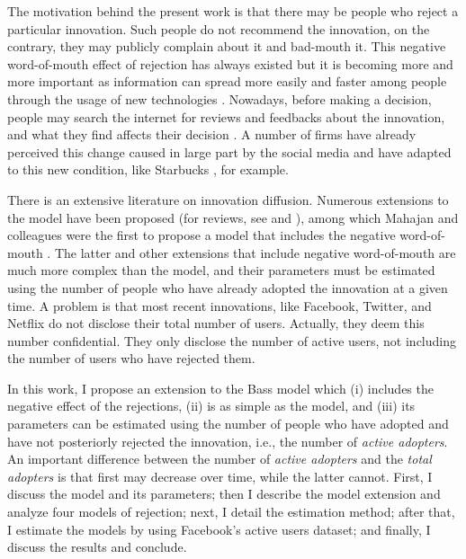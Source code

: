 The motivation behind the present work is that there may be people who reject a particular innovation. Such people do not recommend the innovation, on the contrary, they may publicly complain about it and bad-mouth it. This negative word-of-mouth effect of rejection has always existed \citep{richins1983negative, bone1995word, smith1995effects, buttle1998word} but it is becoming more and more important as information can spread more easily and faster among people through the usage of new technologies \citep{jansen2009twitter, godes2004using, babic2015effect}. Nowadays, before making a decision, people may search the internet for reviews and feedbacks about the innovation, and what they find affects their decision \citep{chen2004impact, dellarocas2003digitization, duan2008online, dellarocas2007exploring, lee2009electronic, pfeffer2014understanding}. A number of firms have already perceived this change caused in large part by the social media and have adapted to this new condition, like Starbucks \citep{gallaugher2010social}, for example.

There is an extensive literature on innovation diffusion. Numerous extensions to the \citet{bass1969} model have been proposed (for reviews, see \citet{meade2006modelling} and \citet{peres2010innovation}), among which Mahajan and colleagues were the first to propose a model that includes the negative word-of-mouth \citep{mahajan1984introduction}. The latter and other extensions that include negative word-of-mouth are much more complex than the \citet{bass1969} model, and their parameters must be estimated using the number of people who have already adopted the innovation at a given time. A problem is that most recent innovations, like Facebook, Twitter, and Netflix do not disclose their total number of users. Actually, they deem this number confidential. They only disclose the number of active users, not including the number of users who have rejected them.

In this work, I propose an extension to the Bass model which (i) includes the negative effect of the rejections, (ii) is as simple as the \citet{bass1969} model, and (iii) its parameters can be estimated using the number of people who have adopted and have not posteriorly rejected the innovation, i.e., the number of \textit{active adopters}. An important difference between the number of \textit{active adopters} and the \textit{total adopters} is that first may decrease over time, while the latter cannot. First, I discuss the \citet{bass1969} model and its parameters; then I describe the model extension and analyze four models of rejection; next, I detail the estimation method; after that, I estimate the models by using Facebook's active users dataset; and finally, I discuss the results and conclude.

